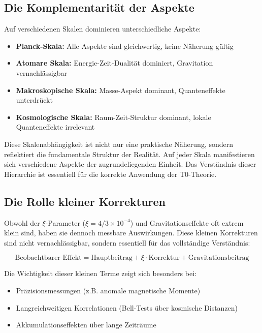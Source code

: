 	\subsection{Die Komplementarität der Aspekte}
	
	Auf verschiedenen Skalen dominieren unterschiedliche Aspekte:
	\begin{itemize}
		\item \textbf{Planck-Skala:} Alle Aspekte sind gleichwertig, keine Näherung gültig
		\item \textbf{Atomare Skala:} Energie-Zeit-Dualität dominiert, Gravitation vernachlässigbar
		\item \textbf{Makroskopische Skala:} Masse-Aspekt dominant, Quanteneffekte unterdrückt
		\item \textbf{Kosmologische Skala:} Raum-Zeit-Struktur dominant, lokale Quanteneffekte irrelevant
	\end{itemize}
	
	Diese Skalenabhängigkeit ist nicht nur eine praktische Näherung, sondern reflektiert die fundamentale Struktur der Realität. Auf jeder Skala manifestieren sich verschiedene Aspekte der zugrundeliegenden Einheit. Das Verständnis dieser Hierarchie ist essentiell für die korrekte Anwendung der T0-Theorie.
	
	\subsection{Die Rolle kleiner Korrekturen}
	
	Obwohl der $\xi$-Parameter ($\xi = 4/3 \times 10^{-4}$) und Gravitationseffekte oft extrem klein sind, haben sie dennoch messbare Auswirkungen. Diese kleinen Korrekturen sind nicht vernachlässigbar, sondern essentiell für das vollständige Verständnis:
	
	\begin{equation}
		\text{Beobachtbarer Effekt} = \text{Hauptbeitrag} + \xi \cdot \text{Korrektur} + \text{Gravitationsbeitrag}
	\end{equation}
	
	Die Wichtigkeit dieser kleinen Terme zeigt sich besonders bei:
	\begin{itemize}
		\item Präzisionsmessungen (z.B. anomale magnetische Momente)
		\item Langreichweitigen Korrelationen (Bell-Tests über kosmische Distanzen)
		\item Akkumulationseffekten über lange Zeiträume
	\end{itemize}
	

